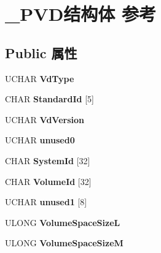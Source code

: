 \hypertarget{struct___p_v_d}{}\section{\+\_\+\+P\+V\+D结构体 参考}
\label{struct___p_v_d}
\subsection*{Public 属性}
\begin{DoxyCompactItemize}
\item 
\mbox{\label{struct___p_v_d_a909648c413405b016481d935c3b30d82}} 
U\+C\+H\+AR {\bfseries Vd\+Type}
\item 
\mbox{\label{struct___p_v_d_acf7a137840ac1879e33f1a366d527a27}} 
C\+H\+AR {\bfseries Standard\+Id} \mbox{[}5\mbox{]}
\item 
\mbox{\label{struct___p_v_d_af0cbde2c3862bfea8b6ccdca9a058188}} 
U\+C\+H\+AR {\bfseries Vd\+Version}
\item 
\mbox{\label{struct___p_v_d_a677abcc1c6084349e7b450a091f15920}} 
U\+C\+H\+AR {\bfseries unused0}
\item 
\mbox{\label{struct___p_v_d_ac53e62247a8c3e0c2c0670d597aabb6f}} 
C\+H\+AR {\bfseries System\+Id} \mbox{[}32\mbox{]}
\item 
\mbox{\label{struct___p_v_d_af4ba22d0fcd8a0f8c3218e320c1235ee}} 
C\+H\+AR {\bfseries Volume\+Id} \mbox{[}32\mbox{]}
\item 
\mbox{\label{struct___p_v_d_a3f86a412a8665e1c35c450c6453c9846}} 
U\+C\+H\+AR {\bfseries unused1} \mbox{[}8\mbox{]}
\item 
\mbox{\label{struct___p_v_d_a2d316b2bb5d31c80aa3c4e473e73c0e0}} 
U\+L\+O\+NG {\bfseries Volume\+Space\+SizeL}
\item 
\mbox{\label{struct___p_v_d_a17adb9e4128a2213a6b82f2bdfbb3d05}} 
U\+L\+O\+NG {\bfseries Volume\+Space\+SizeM}
\item 
\mbox{\label{struct___p_v_d_aa0335d60ff1bfe9e8d0878992fa7c749}} 

\end{DoxyCompactItemize}
